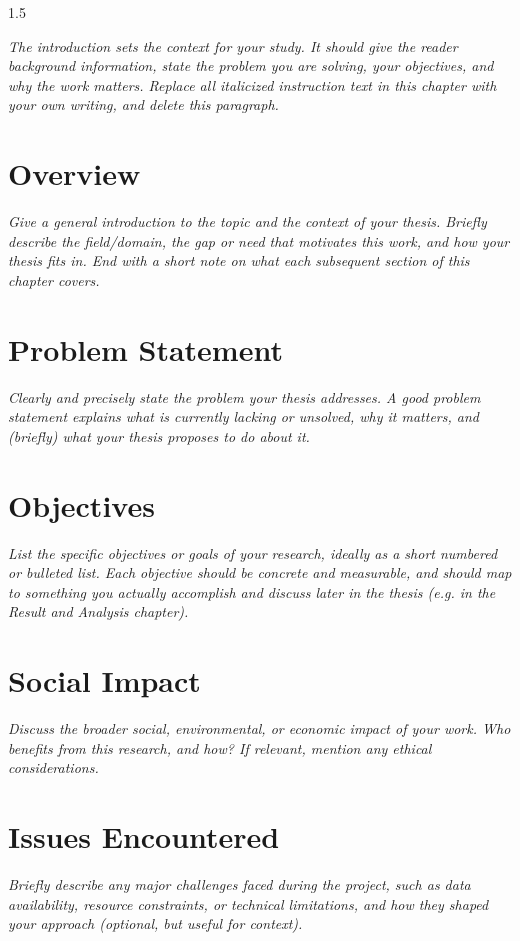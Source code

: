 \begin{spacing}{1.5}
\vspace{1cm}

\textit{The introduction sets the context for your study. It should give the reader background information, state the problem you are solving, your objectives, and why the work matters. Replace all italicized instruction text in this chapter with your own writing, and delete this paragraph.}

\section{Overview}

\textit{Give a general introduction to the topic and the context of your thesis. Briefly describe the field/domain, the gap or need that motivates this work, and how your thesis fits in. End with a short note on what each subsequent section of this chapter covers.}

\section{Problem Statement}

\textit{Clearly and precisely state the problem your thesis addresses. A good problem statement explains what is currently lacking or unsolved, why it matters, and (briefly) what your thesis proposes to do about it.}

\section{Objectives}

\textit{List the specific objectives or goals of your research, ideally as a short numbered or bulleted list. Each objective should be concrete and measurable, and should map to something you actually accomplish and discuss later in the thesis (e.g. in the Result and Analysis chapter).}

\section{Social Impact}

\textit{Discuss the broader social, environmental, or economic impact of your work. Who benefits from this research, and how? If relevant, mention any ethical considerations.}

\section{Issues Encountered}

\textit{Briefly describe any major challenges faced during the project, such as data availability, resource constraints, or technical limitations, and how they shaped your approach (optional, but useful for context).}

\end{spacing}
